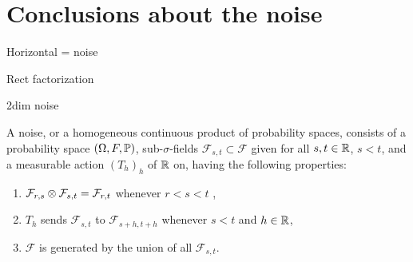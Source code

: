 {
\section{Conclusions about the noise}

Horizontal = noise

Rect factorization

2dim noise

\newcommand{\F}{\mathcal{F}}
A noise, or a homogeneous continuous product of probability
spaces, consists of a probability space $(\Omega,F, \P)$, sub-$\sigma$-fields $\F_{s,t} \subset \F$ given for
all $s, t \in \R$, $s < t$, and a measurable action $(T_h)_h$ of $\R$ on, having the following
properties:
\begin{enumerate}
\item $\F_{r,s} \tensor \F_{s,t} = \F_{r,t}$ whenever $r < s < t$ ,
\item $T_h$ sends $\F_{s,t}$ to $\F_{s+h,t+h}$ whenever $s < t$ and $h \in \R$,
\item $\F$ is generated by the union of all $\F_{s,t}$.
\end{enumerate}



}
